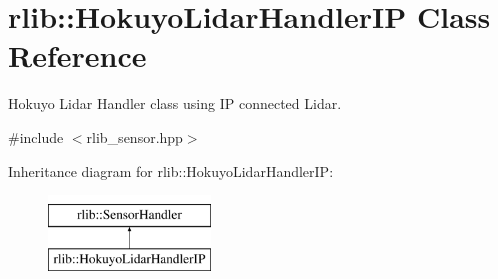 \hypertarget{classrlib_1_1HokuyoLidarHandlerIP}{\section{rlib\-:\-:Hokuyo\-Lidar\-Handler\-I\-P Class Reference}
\label{classrlib_1_1HokuyoLidarHandlerIP}
}


Hokuyo Lidar Handler class using I\-P connected Lidar.  




{\ttfamily \#include $<$rlib\-\_\-sensor.\-hpp$>$}

Inheritance diagram for rlib\-:\-:Hokuyo\-Lidar\-Handler\-I\-P\-:\begin{figure}[H]
\begin{center}
\leavevmode
\includegraphics[height=2.000000cm]{classrlib_1_1HokuyoLidarHandlerIP}
\end{center}
\end{figure}
